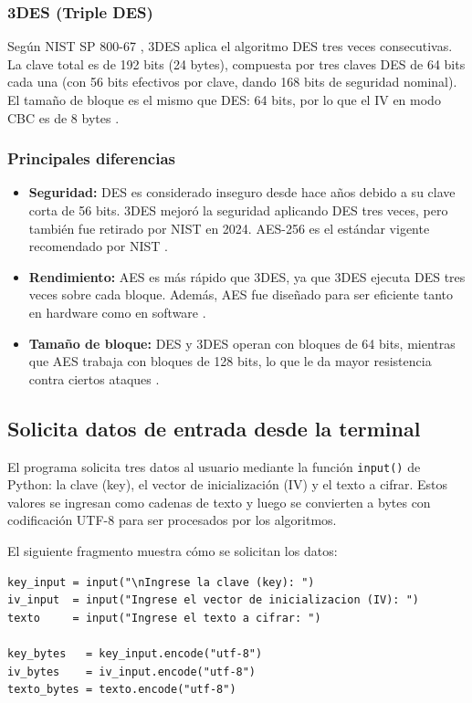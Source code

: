 \documentclass[letter,12pt]{article}
\begin{document}
\subsubsection*{3DES (Triple DES)}
Según NIST SP 800-67 \cite{nist_sp800_67}, 3DES aplica el algoritmo DES tres veces consecutivas. La clave total es de 192 bits (24 bytes), compuesta por tres claves DES de 64 bits cada una (con 56 bits efectivos por clave, dando 168 bits de seguridad nominal). El tamaño de bloque es el mismo que DES: 64 bits, por lo que el IV en modo CBC es de 8 bytes \cite{dworkin2001}.

\subsubsection*{Principales diferencias}

\begin{itemize}
    \item \textbf{Seguridad:} DES es considerado inseguro desde hace años debido a su clave corta de 56 bits. 3DES mejoró la seguridad aplicando DES tres veces, pero también fue retirado por NIST en 2024. AES-256 es el estándar vigente recomendado por NIST \cite{nist_fips197}.
    \item \textbf{Rendimiento:} AES es más rápido que 3DES, ya que 3DES ejecuta DES tres veces sobre cada bloque. Además, AES fue diseñado para ser eficiente tanto en hardware como en software \cite{nist_fips197}.
    \item \textbf{Tamaño de bloque:} DES y 3DES operan con bloques de 64 bits, mientras que AES trabaja con bloques de 128 bits, lo que le da mayor resistencia contra ciertos ataques \cite{dworkin2001}.
\end{itemize}

\clearpage

\subsection{Solicita datos de entrada desde la terminal}

El programa solicita tres datos al usuario mediante la función \texttt{input()} de Python: la clave (key), el vector de inicialización (IV) y el texto a cifrar. Estos valores se ingresan como cadenas de texto y luego se convierten a bytes con codificación UTF-8 para ser procesados por los algoritmos.

El siguiente fragmento muestra cómo se solicitan los datos:

\begin{lstlisting}
key_input = input("\nIngrese la clave (key): ")
iv_input  = input("Ingrese el vector de inicializacion (IV): ")
texto     = input("Ingrese el texto a cifrar: ")

key_bytes   = key_input.encode("utf-8")
iv_bytes    = iv_input.encode("utf-8")
texto_bytes = texto.encode("utf-8")
\end{lstlisting}
\end{document}

